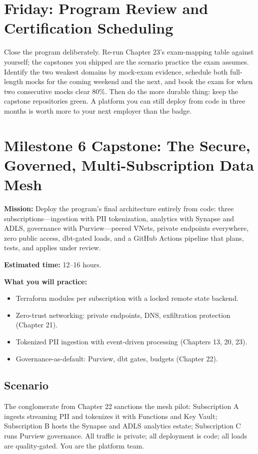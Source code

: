 \section{Friday: Program Review and Certification Scheduling}
Close the program deliberately. Re-run Chapter 23's exam-mapping table against yourself; the capstones you shipped are the scenario practice the exam assumes. Identify the two weakest domains by mock-exam evidence, schedule both full-length mocks for the coming weekend and the next, and book the exam for when two consecutive mocks clear 80\%. Then do the more durable thing: keep the capstone repositories green. A platform you can still deploy from code in three months is worth more to your next employer than the badge.

\section{Milestone 6 Capstone: The Secure, Governed, Multi-Subscription Data Mesh}\label{sec:ch24-capstone}

\begin{capstonebox}
\textbf{Mission:} Deploy the program's final architecture entirely from code: three subscriptions---ingestion with PII tokenization, analytics with Synapse and ADLS, governance with Purview---peered VNets, private endpoints everywhere, zero public access, dbt-gated loads, and a GitHub Actions pipeline that plans, tests, and applies under review.

\textbf{Estimated time:} 12--16 hours.

\textbf{What you will practice:}
\begin{itemize}
    \item Terraform modules per subscription with a locked remote state backend.
    \item Zero-trust networking: private endpoints, DNS, exfiltration protection (Chapter 21).
    \item Tokenized PII ingestion with event-driven processing (Chapters 13, 20, 23).
    \item Governance-as-default: Purview, dbt gates, budgets (Chapter 22).
\end{itemize}
\end{capstonebox}

\subsection*{Scenario}
The conglomerate from Chapter 22 sanctions the mesh pilot: Subscription A ingests streaming PII and tokenizes it with Functions and Key Vault; Subscription B hosts the Synapse and ADLS analytics estate; Subscription C runs Purview governance. All traffic is private; all deployment is code; all loads are quality-gated. You are the platform team.

